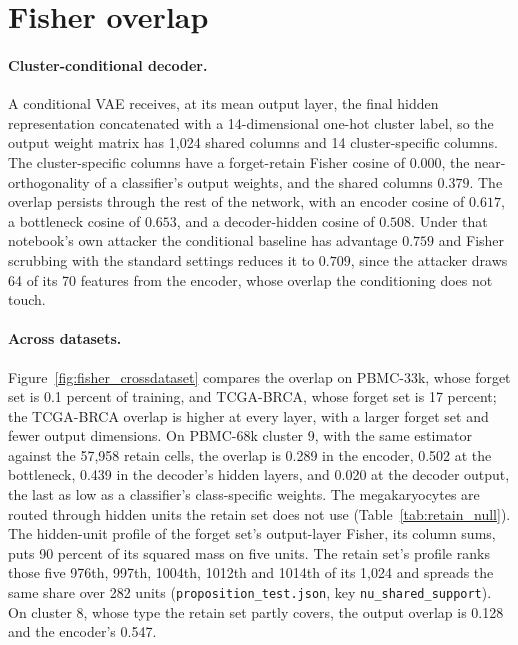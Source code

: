 \documentclass{article}
\begin{document}
\section{Fisher overlap}
\label{app:fisher}

\paragraph{Cluster-conditional decoder.} A conditional VAE receives, at its mean output layer, the final hidden representation concatenated with a 14-dimensional one-hot cluster label, so the output weight matrix has 1,024 shared columns and 14 cluster-specific columns. The cluster-specific columns have a forget-retain Fisher cosine of $0.000$, the near-orthogonality of a classifier's output weights, and the shared columns $0.379$. The overlap persists through the rest of the network, with an encoder cosine of $0.617$, a bottleneck cosine of $0.653$, and a decoder-hidden cosine of $0.508$. Under that notebook's own attacker the conditional baseline has advantage $0.759$ and Fisher scrubbing with the standard settings reduces it to $0.709$, since the attacker draws 64 of its 70 features from the encoder, whose overlap the conditioning does not touch.

\paragraph{Across datasets.} Figure~\ref{fig:fisher_crossdataset} compares the overlap on PBMC-33k, whose forget set is 0.1 percent of training, and TCGA-BRCA, whose forget set is 17 percent; the TCGA-BRCA overlap is higher at every layer, with a larger forget set and fewer output dimensions. On PBMC-68k cluster 9, with the same estimator against the 57,958 retain cells, the overlap is 0.289 in the encoder, 0.502 at the bottleneck, 0.439 in the decoder's hidden layers, and 0.020 at the decoder output, the last as low as a classifier's class-specific weights. The megakaryocytes are routed through hidden units the retain set does not use (Table~\ref{tab:retain_null}). The hidden-unit profile of the forget set's output-layer Fisher, its column sums, puts 90 percent of its squared mass on five units. The retain set's profile ranks those five 976th, 997th, 1004th, 1012th and 1014th of its 1,024 and spreads the same share over 282 units (\texttt{proposition\_test.json}, key \texttt{nu\_shared\_support}). On cluster 8, whose type the retain set partly covers, the output overlap is 0.128 and the encoder's 0.547.
\end{document}
